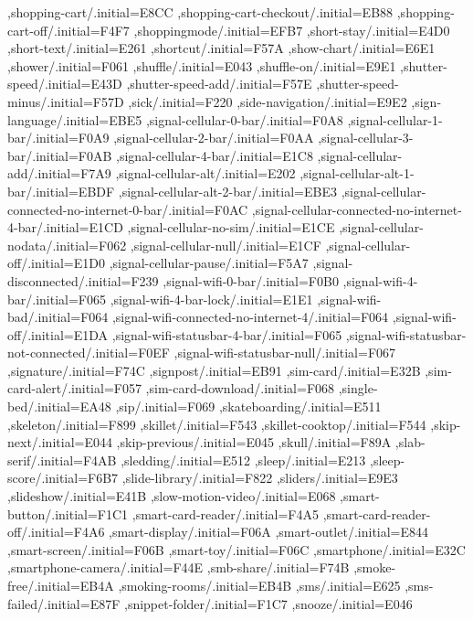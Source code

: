 { ,shopping-cart/.initial=E8CC
 ,shopping-cart-checkout/.initial=EB88
 ,shopping-cart-off/.initial=F4F7
 ,shoppingmode/.initial=EFB7
 ,short-stay/.initial=E4D0
 ,short-text/.initial=E261
 ,shortcut/.initial=F57A
 ,show-chart/.initial=E6E1
 ,shower/.initial=F061
 ,shuffle/.initial=E043
 ,shuffle-on/.initial=E9E1
 ,shutter-speed/.initial=E43D
 ,shutter-speed-add/.initial=F57E
 ,shutter-speed-minus/.initial=F57D
 ,sick/.initial=F220
 ,side-navigation/.initial=E9E2
 ,sign-language/.initial=EBE5
 ,signal-cellular-0-bar/.initial=F0A8
 ,signal-cellular-1-bar/.initial=F0A9
 ,signal-cellular-2-bar/.initial=F0AA
 ,signal-cellular-3-bar/.initial=F0AB
 ,signal-cellular-4-bar/.initial=E1C8
 ,signal-cellular-add/.initial=F7A9
 ,signal-cellular-alt/.initial=E202
 ,signal-cellular-alt-1-bar/.initial=EBDF
 ,signal-cellular-alt-2-bar/.initial=EBE3
 ,signal-cellular-connected-no-internet-0-bar/.initial=F0AC
 ,signal-cellular-connected-no-internet-4-bar/.initial=E1CD
 ,signal-cellular-no-sim/.initial=E1CE
 ,signal-cellular-nodata/.initial=F062
 ,signal-cellular-null/.initial=E1CF
 ,signal-cellular-off/.initial=E1D0
 ,signal-cellular-pause/.initial=F5A7
 ,signal-disconnected/.initial=F239
 ,signal-wifi-0-bar/.initial=F0B0
 ,signal-wifi-4-bar/.initial=F065
 ,signal-wifi-4-bar-lock/.initial=E1E1
 ,signal-wifi-bad/.initial=F064
 ,signal-wifi-connected-no-internet-4/.initial=F064
 ,signal-wifi-off/.initial=E1DA
 ,signal-wifi-statusbar-4-bar/.initial=F065
 ,signal-wifi-statusbar-not-connected/.initial=F0EF
 ,signal-wifi-statusbar-null/.initial=F067
 ,signature/.initial=F74C
 ,signpost/.initial=EB91
 ,sim-card/.initial=E32B
 ,sim-card-alert/.initial=F057
 ,sim-card-download/.initial=F068
 ,single-bed/.initial=EA48
 ,sip/.initial=F069
 ,skateboarding/.initial=E511
 ,skeleton/.initial=F899
 ,skillet/.initial=F543
 ,skillet-cooktop/.initial=F544
 ,skip-next/.initial=E044
 ,skip-previous/.initial=E045
 ,skull/.initial=F89A
 ,slab-serif/.initial=F4AB
 ,sledding/.initial=E512
 ,sleep/.initial=E213
 ,sleep-score/.initial=F6B7
 ,slide-library/.initial=F822
 ,sliders/.initial=E9E3
 ,slideshow/.initial=E41B
 ,slow-motion-video/.initial=E068
 ,smart-button/.initial=F1C1
 ,smart-card-reader/.initial=F4A5
 ,smart-card-reader-off/.initial=F4A6
 ,smart-display/.initial=F06A
 ,smart-outlet/.initial=E844
 ,smart-screen/.initial=F06B
 ,smart-toy/.initial=F06C
 ,smartphone/.initial=E32C
 ,smartphone-camera/.initial=F44E
 ,smb-share/.initial=F74B
 ,smoke-free/.initial=EB4A
 ,smoking-rooms/.initial=EB4B
 ,sms/.initial=E625
 ,sms-failed/.initial=E87F
 ,snippet-folder/.initial=F1C7
 ,snooze/.initial=E046
}
